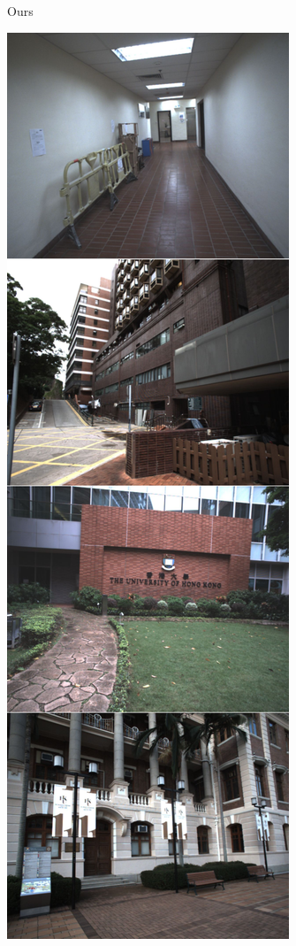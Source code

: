 \documentclass[lettersize,journal]{IEEEtran}
\begin{document}
\begin{figure}[ht]
\begin{subfigure}{0.24\textwidth}
        \caption{Ours}
        \label{fig:qualitativecomparisonours}
    \end{subfigure}
    \hspace{0.0001\textwidth} %
    \begin{subfigure}{0.24\textwidth}
        \centering
        \includegraphics[width=\linewidth]{image/qualitative/groundtruth.pdf}

\end{subfigure}
\end{figure}
\end{document}
